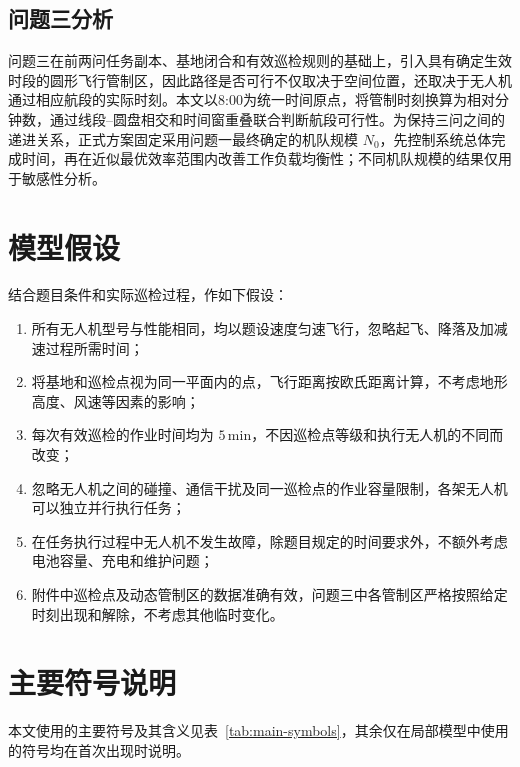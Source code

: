 \documentclass[UTF8,a4paper,12pt]{ctexart}
\numberwithin{equation}{section}
\numberwithin{equation}{section}
\begin{document}
\subsection{问题三分析}
问题三在前两问任务副本、基地闭合和有效巡检规则的基础上，引入具有确定生效时段的圆形飞行管制区，因此路径是否可行不仅取决于空间位置，还取决于无人机通过相应航段的实际时刻。本文以8:00为统一时间原点，将管制时刻换算为相对分钟数，通过线段--圆盘相交和时间窗重叠联合判断航段可行性。为保持三问之间的递进关系，正式方案固定采用问题一最终确定的机队规模 $N_0$，先控制系统总体完成时间，再在近似最优效率范围内改善工作负载均衡性；不同机队规模的结果仅用于敏感性分析。

\section{模型假设}
结合题目条件和实际巡检过程，作如下假设：

\begin{enumerate}[label=\arabic*.]
  \item 所有无人机型号与性能相同，均以题设速度匀速飞行，忽略起飞、降落及加减速过程所需时间；
  \item 将基地和巡检点视为同一平面内的点，飞行距离按欧氏距离计算，不考虑地形高度、风速等因素的影响；
  \item 每次有效巡检的作业时间均为 $5\,\mathrm{min}$，不因巡检点等级和执行无人机的不同而改变；
  \item 忽略无人机之间的碰撞、通信干扰及同一巡检点的作业容量限制，各架无人机可以独立并行执行任务；
  \item 在任务执行过程中无人机不发生故障，除题目规定的时间要求外，不额外考虑电池容量、充电和维护问题；
  \item 附件中巡检点及动态管制区的数据准确有效，问题三中各管制区严格按照给定时刻出现和解除，不考虑其他临时变化。
\end{enumerate}

\section{主要符号说明}
本文使用的主要符号及其含义见表~\ref{tab:main-symbols}，其余仅在局部模型中使用的符号均在首次出现时说明。
\end{document}
